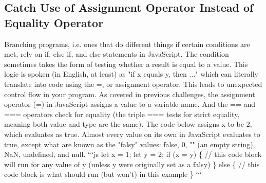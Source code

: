 \documentclass{article}%
\begin{document}
%
\subsection{Catch Use of Assignment Operator Instead of Equality Operator}%
\label{subsec:CatchUseofAssignmentOperatorInsteadofEqualityOperator}%
Branching programs, i.e. ones that do different things if certain conditions are met, rely on if, else if, and else statements in JavaScript. The condition sometimes takes the form of testing whether a result is equal to a value.\newline%
This logic is spoken (in English, at least) as "if x equals y, then ..." which can literally translate into code using the =, or assignment operator. This leads to unexpected control flow in your program.\newline%
As covered in previous challenges, the assignment operator (=) in JavaScript assigns a value to a variable name. And the == and === operators check for equality (the triple === tests for strict equality, meaning both value and type are the same).\newline%
The code below assigns x to be 2, which evaluates as true. Almost every value on its own in JavaScript evaluates to true, except what are known as the "falsy" values: false, 0, "" (an empty string), NaN, undefined, and null.\newline%
```js\newline%
let x = 1;\newline%
let y = 2;\newline%
if (x = y) \{\newline%
  // this code block will run for any value of y (unless y were originally set as a falsy)\newline%
\} else \{\newline%
  // this code block is what should run (but won't) in this example\newline%
\}\newline%
```\newline%

%
\end{document}
